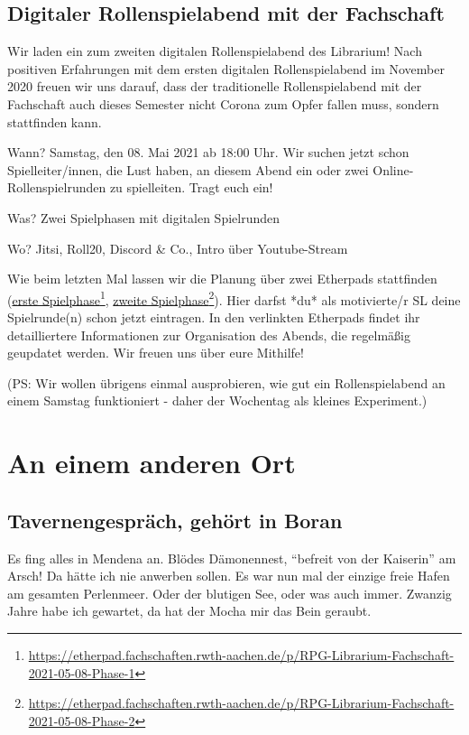 \documentclass[final]{multiversum}
\newcommand\fnref[2]{\href{#1}{#2}\footnote{\url{#1}}}
\begin{document}
\subsection{Digitaler Rollenspielabend mit der Fachschaft}

Wir laden ein zum zweiten digitalen Rollenspielabend des Librarium! Nach positiven Erfahrungen mit dem ersten digitalen Rollenspielabend im November 2020 freuen wir uns darauf, dass der traditionelle Rollenspielabend mit der Fachschaft auch dieses Semester nicht Corona zum Opfer fallen muss, sondern stattfinden kann.

Wann? Samstag, den 08. Mai 2021 ab 18:00 Uhr. Wir suchen jetzt schon Spielleiter/innen, die Lust haben, an diesem Abend ein oder zwei Online-Rollenspielrunden zu spielleiten. Tragt euch ein!

Was? Zwei Spielphasen mit digitalen Spielrunden

Wo? Jitsi, Roll20, Discord \& Co., Intro über Youtube-Stream

Wie beim letzten Mal lassen wir die Planung über zwei Etherpads stattfinden (\fnref{https://etherpad.fachschaften.rwth-aachen.de/p/RPG-Librarium-Fachschaft-2021-05-08-Phase-1}{erste Spielphase}, \fnref{https://etherpad.fachschaften.rwth-aachen.de/p/RPG-Librarium-Fachschaft-2021-05-08-Phase-2}{zweite Spielphase}). 
Hier darfst *du* als motivierte/r SL deine Spielrunde(n) schon jetzt eintragen. 
In den verlinkten Etherpads findet ihr detailliertere Informationen zur Organisation des Abends, die regelmäßig geupdatet werden. 
Wir freuen uns über eure Mithilfe!

(PS: Wir wollen übrigens einmal ausprobieren, wie gut ein Rollenspielabend an einem Samstag funktioniert - daher der Wochentag als kleines Experiment.)

\section{An einem anderen Ort}

\subsection{Tavernengespräch, gehört in Boran}
Es fing alles in Mendena an.
Blödes Dämonennest, \enquote{befreit von der Kaiserin} am Arsch!
Da hätte ich nie anwerben sollen.
Es war nun mal der einzige freie Hafen am gesamten Perlenmeer.
Oder der blutigen See, oder was auch immer.
Zwanzig Jahre habe ich gewartet, da hat der Mocha mir das Bein geraubt.
\end{document}
